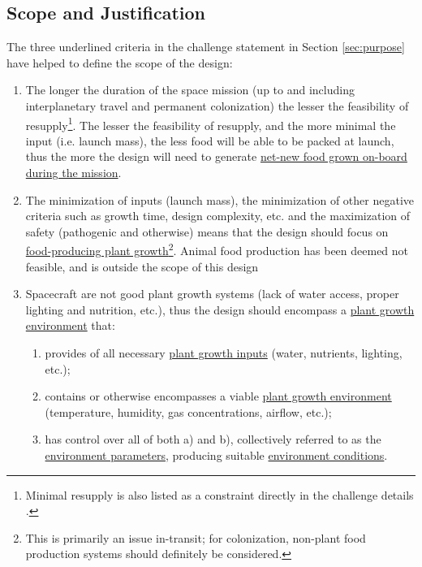 \documentclass{../tex/report}
\begin{document}


\clearpage
\subsection{Scope and Justification}
\label{sec:scope}

The three underlined criteria in the challenge statement in Section \ref{sec:purpose} have helped to define the scope of the design:
\begin{enumerate}[label=SC\arabic*., ref=SC\arabic*]
    \item \label{sc:1} The longer the duration of the space mission (up to and including interplanetary travel and permanent colonization) the lesser the feasibility of resupply\footnote{Minimal resupply is also listed as a constraint directly in the challenge details \cite{applicantguide,dsfc-phase2}.}. The lesser the feasibility of resupply, and the more minimal the input (i.e. launch mass), the less food will be able to be packed at launch, thus the more the design will need to generate \uline{net-new food grown on-board during the mission}.
    \item \label{sc:2} The minimization of inputs (launch mass), the minimization of other negative criteria such as growth time, design complexity, etc. and the maximization of safety (pathogenic and otherwise) means that the design should focus on \uline{food-producing plant growth}\footnote{This is primarily an issue in-transit; for colonization, non-plant food production systems should definitely be considered.}. Animal food production has been deemed not feasible, and is outside the scope of this design
    \item \label{sc:3} Spacecraft are not good plant growth systems (lack of water access, proper lighting and nutrition, etc.), thus the design should encompass a \uline{plant growth environment} that:
        \begin{enumerate}[label=SC3\alph*., ref=SC3\alph*]
            \item \label{sc:3a} provides of all necessary \uline{plant growth inputs} (water, nutrients, lighting, etc.);
            \item \label{sc:3b} contains or otherwise encompasses a viable \uline{plant growth environment} (temperature, humidity, gas concentrations, airflow, etc.);
        \item \label{sc:3c} has control over all of both a) and b), collectively referred to as the \uline{environment parameters}, producing suitable \uline{environment conditions}.

\end{enumerate}
\end{enumerate}
\end{document}
